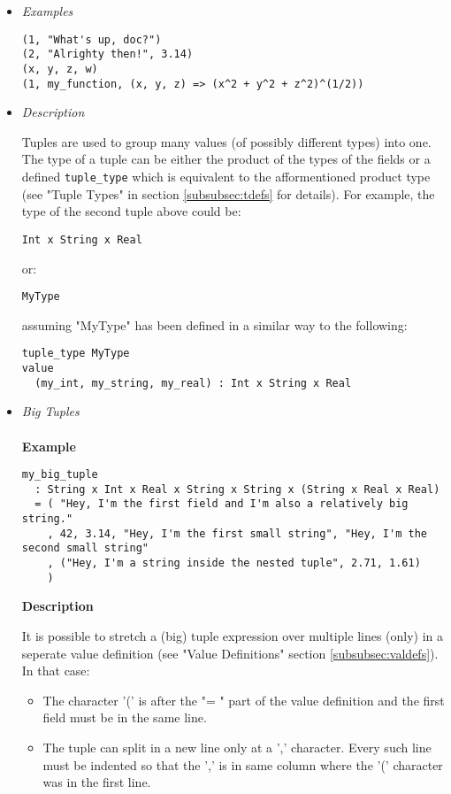 \documentclass{article}
\begin{document}
\begin{itemize}

\item \textit{Examples}
\begin{verbatim}
(1, "What's up, doc?")
(2, "Alrighty then!", 3.14)
(x, y, z, w)
(1, my_function, (x, y, z) => (x^2 + y^2 + z^2)^(1/2))
\end{verbatim}

\item \textit{Description} 

Tuples are used to group many values (of possibly different types) into one.
The type of a tuple can be either the product of the types of the fields or a
defined \texttt{tuple_type} which is equivalent to the afformentioned product
type (see "Tuple Types" in section \ref{subsubsec:tdefs} for details). For
example, the type of the second tuple above could be:
\begin{verbatim}
Int x String x Real
\end{verbatim}
or:
\begin{verbatim}
MyType
\end{verbatim}
assuming "MyType" has been defined in a similar way to the following:
\begin{verbatim}
tuple_type MyType
value
  (my_int, my_string, my_real) : Int x String x Real
\end{verbatim}

\item \textit{Big Tuples}
\\\\
\textbf{Example}
\begin{verbatim}
my_big_tuple
  : String x Int x Real x String x String x (String x Real x Real)
  = ( "Hey, I'm the first field and I'm also a relatively big string."
    , 42, 3.14, "Hey, I'm the first small string", "Hey, I'm the second small string"
    , ("Hey, I'm a string inside the nested tuple", 2.71, 1.61)
    )
\end{verbatim}

\textbf{Description}

It is possible to stretch a (big) tuple expression over multiple lines (only)
in a seperate value definition (see "Value Definitions" section
\ref{subsubsec:valdefs}).  In that case:
\begin{itemize}
\item
The character '(' is after the "= " part of the value definition
and the first field must be in the same line.

\item
The tuple can split in a new line only at a ',' character. Every such line must
be indented so that the ',' is in same column where the '(' character was in
the first line.


\end{itemize}
\end{itemize}
\end{document}
